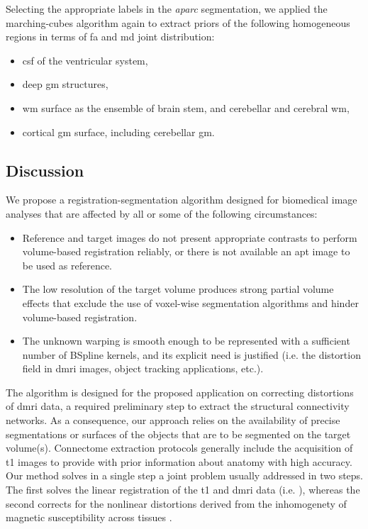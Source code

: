 Selecting the appropriate labels in the \emph{aparc} segmentation, we applied
  the marching-cubes algorithm again to extract priors of the following
  homogeneous regions in terms of \gls*{fa} and \gls*{md} joint distribution:
\begin{itemize}
	\item \gls*{csf} of the ventricular system,
	\item deep \gls*{gm} structures,
	\item \gls*{wm} surface as the ensemble of brain stem, and
	  cerebellar and cerebral \gls*{wm},
	\item cortical \gls*{gm} surface, including cerebellar \gls*{gm}.
\end{itemize}

\subsection*{Discussion}
\label{sec:discussion}
We propose a registration-segmentation algorithm designed for biomedical
  image analyses that are affected by all or some of the following circumstances:
  \begin{itemize}
  	\item Reference and target images do not present appropriate contrasts to
  	perform volume-based registration reliably, or there is not available an apt image
 		to be used as reference.
  	\item The low resolution of the target volume produces strong partial volume effects
  	that exclude the use of voxel-wise segmentation algorithms and hinder volume-based
  	registration.
  	\item The unknown warping is smooth enough to be represented with a sufficient number
  	of BSpline kernels, and its explicit need is justified (i.e. the distortion
  	field in \gls*{dmri} images, object tracking applications, etc.).
  \end{itemize}
The algorithm is designed for the proposed application on correcting distortions of
  \gls*{dmri} data, a required preliminary step to extract the structural connectivity
  networks.
As a consequence, our approach relies on the availability of precise segmentations or
  surfaces of the objects that are to be segmented on the target volume(s).
Connectome extraction protocols generally include the acquisition of \gls*{t1} images
  to provide with prior information about anatomy with high accuracy.
Our method solves in a single step a joint problem usually addressed in two steps.
The first solves the linear registration of the \gls*{t1} and \gls*{dmri} data (i.e.
  \cite{greve_accurate_2009}), whereas the second corrects for the nonlinear distortions
  derived from the inhomogenety of magnetic susceptibility across tissues
  \citep{jezzard_correction_1995}.

